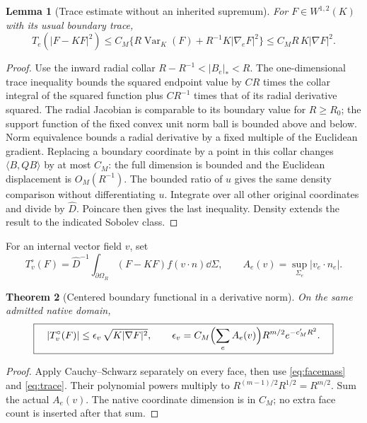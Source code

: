 \documentclass[11pt,letterpaper]{article}
\newtheorem{theorem}{Theorem}[section]
\newtheorem{lemma}[theorem]{Lemma}
\theoremstyle{remark}\newtheorem{remark}[theorem]{Remark}
\newcommand{\Var}{\operatorname{Var}}\newcommand{\Cov}{\operatorname{Cov}}
\begin{document}
\begin{lemma}[Trace estimate without an inherited supremum]\label{lem:trace}
For $F\in W^{1,2}(K)$ with its usual boundary trace,
\begin{equation}\label{eq:trace}
 T_e(|F-KF|^2)
 \le C_M\{R\Var_K(F)+R^{-1}K|\nabla_eF|^2\}
 \le C_MR\,K|\nabla F|^2.
\end{equation}
\end{lemma}
\begin{proof}
Use the inward radial collar $R-R^{-1}<|B_e|_*<R$. The one-dimensional trace inequality bounds the squared endpoint value by $C R$ times the collar integral of the squared function plus $C R^{-1}$ times that of its radial derivative squared. The radial Jacobian is comparable to its boundary value for $R\ge R_0$; the support function of the fixed convex unit norm ball is bounded above and below. Norm equivalence bounds a radial derivative by a fixed multiple of the Euclidean gradient. Replacing a boundary coordinate by a point in this collar changes $\langle B,QB\rangle$ by at most $C_M$: the full dimension is bounded and the Euclidean displacement is $O_M(R^{-1})$. The bounded ratio of $u$ gives the same density comparison without differentiating $u$. Integrate over all other original coordinates and divide by $\widehat D$. Poincare then gives the last inequality. Density extends the result to the indicated Sobolev class.
\end{proof}

For an internal vector field $v$, set
\[
 T_v^\circ(F)=\widehat D^{-1}\int_{\partial\Omega_R}
      (F-KF)f(v\cdot n)\dd\Sigma,\qquad
 A_e(v)=\sup_{\Sigma_e}|v_e\cdot n_e|.
\]

\begin{theorem}[Centered boundary functional in a derivative norm]\label{thm:boundary}
On the same admitted native domain,
\begin{equation}\label{eq:boundarydual}
 \boxed{\quad
 |T_v^\circ(F)|
 \le \epsilon_v\,\sqrt{K|\nabla F|^2},\qquad
 \epsilon_v=C_M\Bigl(\sum_e A_e(v)\Bigr)
       R^{m/2}e^{-c'_MR^2}.
 \quad}
\end{equation}
\end{theorem}
\begin{proof}
Apply Cauchy--Schwarz separately on every face, then use
\eqref{eq:facemass} and \eqref{eq:trace}. Their polynomial powers multiply to
$R^{(m-1)/2}R^{1/2}=R^{m/2}$. Sum the actual $A_e(v)$. The native coordinate dimension is in $C_M$; no extra face count is inserted after that sum.
\end{proof}
\end{document}
